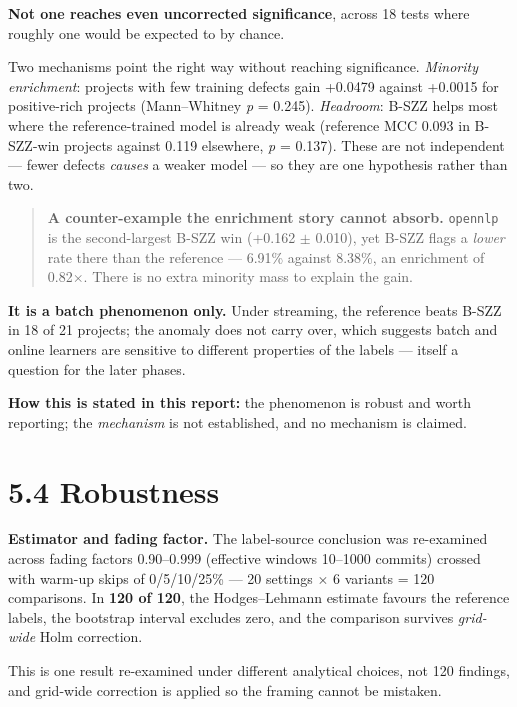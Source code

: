 \textbf{Not one reaches even uncorrected significance}, across 18 tests
where roughly one would be expected to by chance.

Two mechanisms point the right way without reaching significance.
\emph{Minority enrichment}: projects with few training defects gain
+0.0479 against +0.0015 for positive-rich projects (Mann--Whitney
\emph{p} = 0.245). \emph{Headroom}: B-SZZ helps most where the
reference-trained model is already weak (reference MCC 0.093 in
B-SZZ-win projects against 0.119 elsewhere, \emph{p} = 0.137). These are
not independent --- fewer defects \emph{causes} a weaker model --- so
they are one hypothesis rather than two.

\begin{quote}
\textbf{A counter-example the enrichment story cannot absorb.}
\texttt{opennlp} is the second-largest B-SZZ win (+0.162 \ensuremath{\pm} 0.010), yet
B-SZZ flags a \emph{lower} rate there than the reference --- 6.91\%
against 8.38\%, an enrichment of 0.82\ensuremath{\times}. There is no extra minority mass
to explain the gain.
\end{quote}

\textbf{It is a batch phenomenon only.} Under streaming, the reference
beats B-SZZ in 18 of 21 projects; the anomaly does not carry over, which
suggests batch and online learners are sensitive to different properties
of the labels --- itself a question for the later phases.

\textbf{How this is stated in this report:} the phenomenon is robust and
worth reporting; the \emph{mechanism} is not established, and no
mechanism is claimed.

\section{5.4 Robustness}\label{robustness}

\textbf{Estimator and fading factor.} The label-source conclusion was
re-examined across fading factors 0.90--0.999 (effective windows
10--1000 commits) crossed with warm-up skips of 0/5/10/25\% --- 20
settings \ensuremath{\times} 6 variants = 120 comparisons. In \textbf{120 of 120}, the
Hodges--Lehmann estimate favours the reference labels, the bootstrap
interval excludes zero, and the comparison survives \emph{grid-wide}
Holm correction.

This is one result re-examined under different analytical choices, not
120 findings, and grid-wide correction is applied so the framing cannot
be mistaken.

